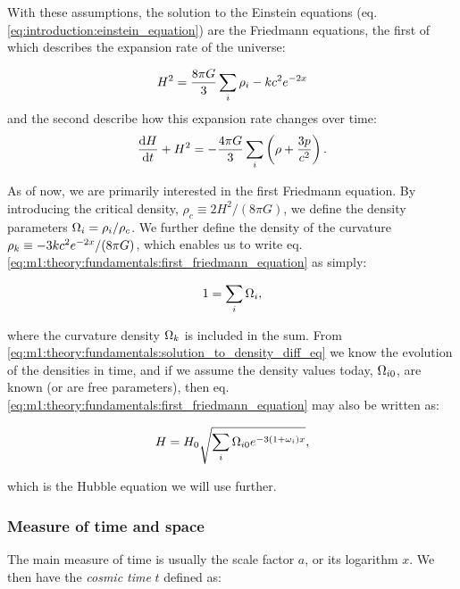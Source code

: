     With these assumptions, the solution to the Einstein equations (eq. \ref{eq:introduction:einstein_equation}) are the Friedmann equations, the first of which describes the expansion rate of the universe:

    \begin{equation}
        \label{eq:m1:theory:fundamentals:first_friedmann_equation}
        H^2 = \frac{8\pi G}{3}\sum_i\rho_i - kc^2e^{-2x} \\
    \end{equation}
    and the second describe how this expansion rate changes over time:
    \begin{equation}
        \label{eq:m1:theory:fundamentals:second_friedmann_equation}
        \dv{H}{t}+H^2 = -\frac{4\pi G}{3}\sum_i\left(\rho+\frac{3p}{c^2}\right).
    \end{equation}

    As of now, we are primarily interested in the first Friedmann equation. By introducing the critical density, $\rho_c\equiv2H^2/(8\pi G)$, we define the density parameters $\Omega_i=\rho_i/\rho_c$. We further define the density of the curvature $\rho_k\equiv-3kc^2e^{-2x}/(8\pi G)$, which enables us to write eq. \ref{eq:m1:theory:fundamentals:first_friedmann_equation} as simply:

    \begin{equation}
        1=\sum_i\Omega_i,
    \end{equation}

    where the curvature density $\Omega_k$ is included in the sum. From \cref{eq:m1:theory:fundamentals:solution_to_density_diff_eq} we know the evolution of the densities in time, and if we assume the density values today, $\Omega_{i0}$, are known (or are free parameters), then eq. \ref{eq:m1:theory:fundamentals:first_friedmann_equation} may also be written as:

    \begin{equation}\label{eq:m1:theory:fundamentals:Hubble_equation}
        H = H_0\sqrt{\sum_i\Omega_{i0}e^{-3(1+\omega_i)x}},
    \end{equation}

    which is the Hubble equation we will use further.




\subsubsection{Measure of time and space}\label{sec:m1:measure_time_space}
    The main measure of time is usually the scale factor $a$, or its logarithm $x$. We then have the \textit{cosmic time} $t$ defined as:


